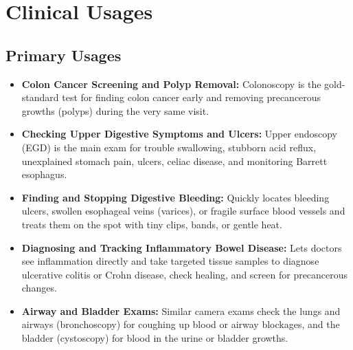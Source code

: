 \section{Clinical Usages}

\subsection{Primary Usages}
\begin{itemize}
\item \textbf{Colon Cancer Screening and Polyp Removal:} Colonoscopy is the gold-standard test for finding colon cancer early and removing precancerous growths (polyps) during the very same visit.
\item \textbf{Checking Upper Digestive Symptoms and Ulcers:} Upper endoscopy (EGD) is the main exam for trouble swallowing, stubborn acid reflux, unexplained stomach pain, ulcers, celiac disease, and monitoring Barrett esophagus.
\item \textbf{Finding and Stopping Digestive Bleeding:} Quickly locates bleeding ulcers, swollen esophageal veins (varices), or fragile surface blood vessels and treats them on the spot with tiny clips, bands, or gentle heat.
\item \textbf{Diagnosing and Tracking Inflammatory Bowel Disease:} Lets doctors see inflammation directly and take targeted tissue samples to diagnose ulcerative colitis or Crohn disease, check healing, and screen for precancerous changes.
\item \textbf{Airway and Bladder Exams:} Similar camera exams check the lungs and airways (bronchoscopy) for coughing up blood or airway blockages, and the bladder (cystoscopy) for blood in the urine or bladder growths.
\end{itemize}

